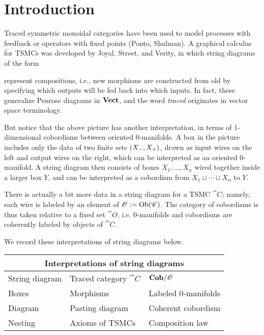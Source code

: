 \chapter{Introduction}

Traced symmetric monoidal categories have been used to model processes with feedback or operators with fixed points (Ponto, Shulman). A graphical calculus for TSMCs was developed by Joyal, Street, and Verity, in which string diagrams of the form
\begin{center}\end{center}
represent compositions, i.e., new morphisms are constructed from old by specifying which outputs will be fed back into which inputs. In fact, these generalize Penrose diagrams in $\mathbf{Vect}$, and the word \emph{traced} originates in vector space terminology.  

But notice that the above picture has another interpretation, in terms of 1-dimensional cobordisms between oriented 0-manifolds. A box in the picture includes only the data of two finite sets $({X_-},{X_+})$, drawn as input wires on the left and output wires on the right, which can be interpreted as an oriented 0-manifold. A string diagram then consists of boxes $X_1,\ldots,X_n$ wired together inside a larger box $Y$, and can be interpreted as a cobordism from $X_1\sqcup\cdots\sqcup X_n$ to $Y$. 

There is actually a bit more data in a string diagram for a TSMC $\cat{C}$; namely, each wire is labeled by an element of $\mathscr{O}:=\operatorname{Ob}(\mathscr{C})$. The category of cobordisms is thus taken relative to a fixed set $\cat{O}$, i.e. 0-manifolds and cobordisms are coherently labeled by objects of $\cat{C}$.

We record these interpretations of string diagrams below.

\begin{center}
\begin{tabular}{| l | l | l |}
\hline
\multicolumn{3}{|c|}{Interpretations of string diagrams}\\\hline\hline
String diagram & Traced category $\cat{C}$ & $\mathbf{Cob}/\mathscr{O}$\\\hline
Boxes & Morphisms & Labeled 0-manifolds\\
Diagram & Pasting diagram & Coherent cobordism\\
Nesting & Axioms of TSMCs & Composition law\\\hline
\end{tabular}
\end{center}

